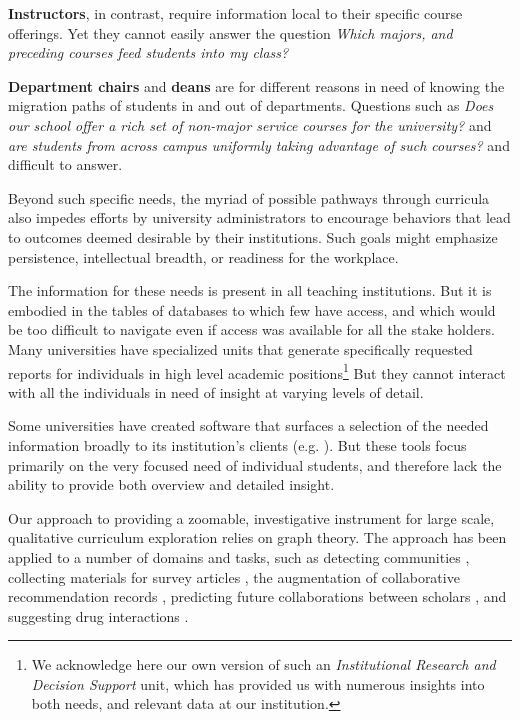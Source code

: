 {\bf Instructors}, in contrast, require information local to their
specific course offerings. Yet they cannot easily answer the question
{\it Which majors, and preceding courses feed students into my class?}

{\bf Department chairs} and {\bf deans} are for different reasons in
need of knowing the migration paths of students in and out of
departments. Questions such as {\it Does our school offer a rich set
  of non-major service courses for the university?} and {\it are
  students from across campus uniformly taking advantage of such
  courses?} and difficult to answer.

Beyond such specific needs, the myriad of possible pathways through
curricula also impedes efforts by university administrators to
encourage behaviors that lead to outcomes deemed desirable by
their institutions. Such goals might emphasize persistence,
intellectual breadth, or readiness for the workplace.

The information for these needs is present in all teaching
institutions. But it is embodied in the tables of databases to which
few have access, and which would be too difficult to navigate even if
access was available for all the stake holders. Many universities have
specialized units that generate specifically requested reports for
individuals in high level academic positions\footnote{We acknowledge
  here our own version of such an {\it Institutional Research and
    Decision Support} unit, which has provided us with numerous
  insights into both needs, and relevant data at our institution.} But
they cannot interact with all the individuals in need of insight at
varying levels of detail.

Some universities have created software that surfaces a selection of
the needed information broadly to its institution's clients
(e.g. \cite{carta}). But these tools focus primarily on the very
focused need of individual students, and therefore lack the ability to
provide both overview and detailed insight.

Our approach to providing a zoomable, investigative instrument for
large scale, qualitative curriculum exploration relies on graph
theory. The approach has been applied to a number of domains and
tasks, such as detecting communities \cite{PhysRevE.70.056104},
collecting materials for survey articles \cite{ji2015}, the
augmentation of collaborative recommendation records \cite{huang2005},
predicting future collaborations between scholars \cite{liben2007},
and suggesting drug interactions \cite{zitnik2018}.


